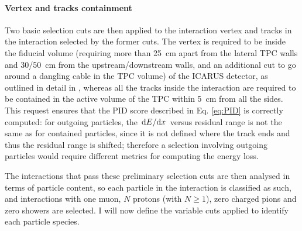 \paragraph{Vertex and tracks containment} Two basic selection cuts are then applied to the interaction vertex and tracks in the interaction selected by the former cuts. The vertex is required to be inside the fiducial volume (requiring more than \SI{25}{\cm} apart from the lateral TPC walls and 30/\SI{50}{\cm} from the upstream/downstream walls, and an additional cut to go around a dangling cable in the TPC volume) of the ICARUS detector, as outlined in detail in \cite{arteroponsStudyReconstructionNuMuCC}, whereas all the tracks inside the interaction are required to be contained in the active volume of the TPC within \SI{5}{\cm} from all the sides. This request ensures that the PID score described in Eq. \eqref{eq:PID} is correctly computed: for outgoing particles, the $\dv*{E}{x}$ versus residual range is not the same as for contained particles, since it is not defined where the track ends and thus the residual range is shifted; therefore a selection involving outgoing particles would require different metrics for computing the energy loss. 

The interactions that pass these preliminary selection cuts are then analysed in terms of particle content, so each particle in the interaction is classified as such, and interactions with one muon, $N$ protons (with $N\geq1$), zero charged pions and zero showers are selected. I will now define the variable cuts applied to identify each particle species. 

